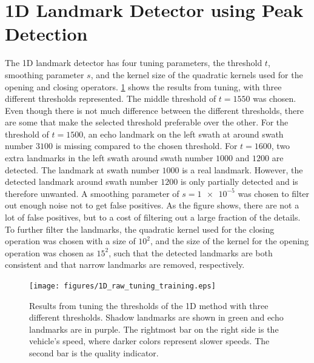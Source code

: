 \section{1D Landmark Detector using Peak Detection}

The 1D landmark detector has four tuning parameters, the threshold $t$, smoothing parameter $s$, and the kernel size of the quadratic kernels used for the opening and closing operators. \cref{fig:1D_norm_tuning_training} shows the results from tuning, with three different thresholds represented. The middle threshold of $t = 1550$ was chosen. Even though there is not much difference between the different thresholds, there are some that make the selected threshold preferable over the other. For the threshold of $t = 1500$, an echo landmark on the left swath at around swath number $3100$ is missing compared to the chosen threshold. For $t = 1600$, two extra landmarks in the left swath around swath number $1000$ and $1200$ are detected. The landmark at swath number $1000$ is a real landmark. However, the detected landmark around swath number $1200$ is only partially detected and is therefore unwanted. A smoothing parameter of $s = \num{1e-5}$ was chosen to filter out enough noise not to get false positives. As the figure shows, there are not a lot of false positives, but to a cost of filtering out a large fraction of the details. To further filter the landmarks, the quadratic kernel used for the closing operation was chosen with a size of $10^2$, and the size of the kernel for the opening operation was chosen as $15^2$, such that the detected landmarks are both consistent and that narrow landmarks are removed, respectively.  

\begin{figure}  %
  \centering
  \texttt{[image: figures/1D\_raw\_tuning\_training.eps]}
  \caption[Results of tuning threshold of the 1D method]{Results from tuning the thresholds of the 1D method with three different thresholds. Shadow landmarks are shown in green and echo landmarks are in purple. The rightmost bar on the right side is the vehicle's speed, where darker colors represent slower speeds. The second bar is the quality indicator.}
  \label{fig:1D_norm_tuning_training}
\end{figure}

